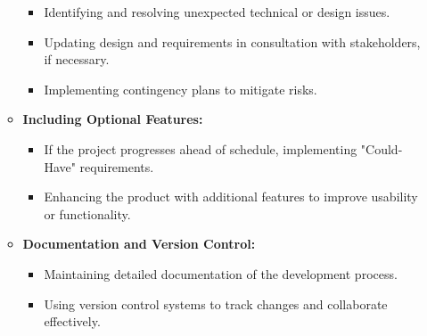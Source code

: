 \documentclass{article}
\begin{document}
\begin{itemize}[leftmargin=*, label={}]
\begin{itemize}
        \begin{itemize}
            \item Identifying and resolving unexpected technical or design issues.
            \item Updating design and requirements in consultation with stakeholders, if necessary.
            \item Implementing contingency plans to mitigate risks.
        \end{itemize}
        \item \textbf{Including Optional Features:}
        \begin{itemize}
            \item If the project progresses ahead of schedule, implementing "Could-Have" requirements.
            \item Enhancing the product with additional features to improve usability or functionality.
        \end{itemize}
        \item \textbf{Documentation and Version Control:}
        \begin{itemize}
            \item Maintaining detailed documentation of the development process.
            \item Using version control systems to track changes and collaborate effectively.
        \end{itemize}
    \end{itemize}


\end{itemize}
\end{document}
